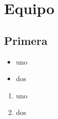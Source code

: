 \chapter{Equipo}

\section{Primera}

\begin{itemize}
\item uno
\item dos
\end{itemize}

\begin{enumerate}
	\item uno
	\item dos
\end{enumerate}